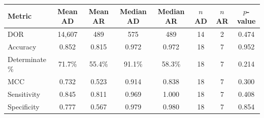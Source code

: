 \begin{tabular}{lccccccc}
\toprule
Metric & Mean AD & Mean AR & Median AD & Median AR & $n$ AD & $n$ AR & $p$-value \\
\midrule
DOR & 14,607 & 489 & 575 & 489 & 14 & 2 & 0.474 \\
Accuracy & 0.852 & 0.815 & 0.972 & 0.972 & 18 & 7 & 0.952 \\
Determinate \% & 71.7\% & 55.4\% & 91.1\% & 58.3\% & 18 & 7 & 0.214 \\
MCC & 0.732 & 0.523 & 0.914 & 0.838 & 18 & 7 & 0.300 \\
Sensitivity & 0.845 & 0.811 & 0.969 & 1.000 & 18 & 7 & 0.408 \\
Specificity & 0.777 & 0.567 & 0.979 & 0.980 & 18 & 7 & 0.854 \\
\bottomrule
\end{tabular}
